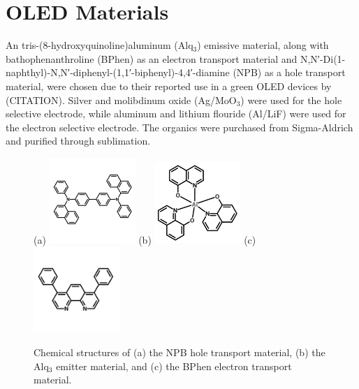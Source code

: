 \documentclass{report}
\begin{document}
    \section{OLED Materials} \label{materials}
    An tris-(8-hydroxyquinoline)aluminum (Alq$_3$) emissive material, along with bathophenanthroline (BPhen) as an electron transport material and N,N′-Di(1-naphthyl)-N,N′-diphenyl-(1,1′-biphenyl)-4,4′-diamine (NPB) as a hole transport material, were chosen due to their reported use in a green OLED devices by (CITATION). Silver and molibdinum oxide (Ag/MoO$_3$) were used for the hole selective electrode, while aluminum and lithium flouride (Al/LiF) were used for the electron selective electrode. The organics were purchased from Sigma-Aldrich and purified through sublimation.\\
    \begin{figure}[h!]
        \centering
        (a)
        \includegraphics[width=0.29\textwidth]{images/npb_structure.jpg}
        (b)
        \includegraphics[width=0.29\textwidth]{images/alq3_structure.png}
        (c)
        \includegraphics[width=0.29\textwidth]{images/bphen_structure.jpg}
        \caption{Chemical structures of (a) the NPB hole transport material, (b) the Alq$_3$ emitter material, and (c) the BPhen electron transport material.}
        \label{fig:structures}
    \end{figure}
\end{document}
